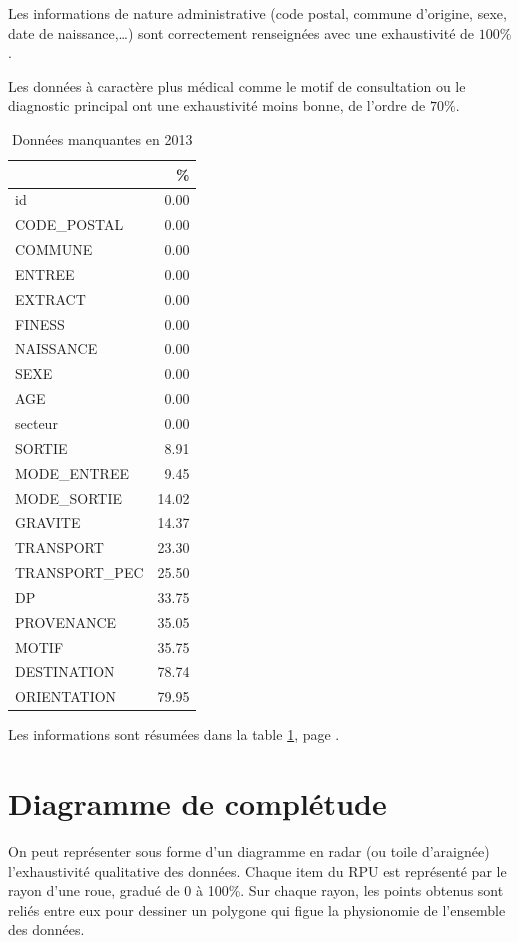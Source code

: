 \documentclass[12pt,english,french,twoside]{book}\usepackage[]{graphicx}\usepackage[]{color}
\begin{document}
Les informations de nature administrative (code postal, commune d'origine, sexe, date de naissance,\dots ) sont correctement renseignées avec une exhaustivité de $100\%$.

Les données à caractère plus médical comme le motif de consultation ou le diagnostic principal ont une exhaustivité moins bonne, de l'ordre de $70\%$.

\begin{table}[ht]
\centering
\begin{tabular}{|l|r|}
  \hline
 & \% \\ 
  \hline
id & 0.00 \\ 
  CODE\_POSTAL & 0.00 \\ 
  COMMUNE & 0.00 \\ 
  ENTREE & 0.00 \\ 
  EXTRACT & 0.00 \\ 
  FINESS & 0.00 \\ 
  NAISSANCE & 0.00 \\ 
  SEXE & 0.00 \\ 
  AGE & 0.00 \\ 
  secteur & 0.00 \\ 
  SORTIE & 8.91 \\ 
  MODE\_ENTREE & 9.45 \\ 
  MODE\_SORTIE & 14.02 \\ 
  GRAVITE & 14.37 \\ 
  TRANSPORT & 23.30 \\ 
  TRANSPORT\_PEC & 25.50 \\ 
  DP & 33.75 \\ 
  PROVENANCE & 35.05 \\ 
  MOTIF & 35.75 \\ 
  DESTINATION & 78.74 \\ 
  ORIENTATION & 79.95 \\ 
   \hline
\end{tabular}
\caption{Données manquantes en 2013} 
\label{tab2}
\end{table}



Les informations sont résumées dans la table \ref{tab2}, page \pageref{tab2}.

\section{Diagramme de complétude}

On peut représenter sous forme d'un diagramme en radar (ou toile d'araignée) l'exhaustivité qualitative des données. Chaque item du RPU est représenté par le rayon d'une roue, gradué de 0 à 100\%. Sur chaque rayon, les points obtenus sont reliés entre eux pour dessiner un polygone qui figue la physionomie de l'ensemble des données.
\end{document}
